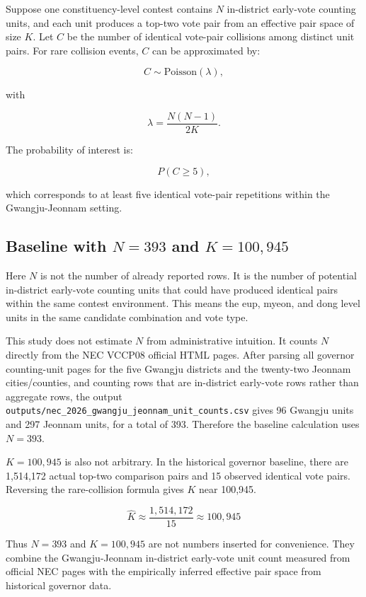 \documentclass[preprint]{../ieie/IEIE}
\begin{document}
Suppose one constituency-level contest contains \(N\) in-district early-vote counting units, and each unit produces a top-two vote pair from an effective pair space of size \(K\). Let \(C\) be the number of identical vote-pair collisions among distinct unit pairs. For rare collision events, \(C\) can be approximated by:

\[
C \sim \mathrm{Poisson}(\lambda),
\]

with

\[
\lambda = \frac{N(N-1)}{2K}.
\]

The probability of interest is:

\[
P(C \geq 5),
\]

which corresponds to at least five identical vote-pair repetitions within the Gwangju-Jeonnam setting.

\subsection{Baseline with \(N=393\) and \(K=100,945\)}

Here \(N\) is not the number of already reported rows. It is the number of potential in-district early-vote counting units that could have produced identical pairs within the same contest environment. This means the eup, myeon, and dong level units in the same candidate combination and vote type.

This study does not estimate \(N\) from administrative intuition. It counts \(N\) directly from the NEC VCCP08 official HTML pages. After parsing all governor counting-unit pages for the five Gwangju districts and the twenty-two Jeonnam cities/counties, and counting rows that are in-district early-vote rows rather than aggregate rows, the output \texttt{outputs/nec\_2026\_gwangju\_jeonnam\_unit\_counts.csv} gives 96 Gwangju units and 297 Jeonnam units, for a total of 393. Therefore the baseline calculation uses \(N=393\).

\(K=100,945\) is also not arbitrary. In the historical governor baseline, there are 1,514,172 actual top-two comparison pairs and 15 observed identical vote pairs. Reversing the rare-collision formula gives \(K\) near 100,945.

\[
\hat{K} \approx \frac{1,514,172}{15} \approx 100,945
\]

Thus \(N=393\) and \(K=100,945\) are not numbers inserted for convenience. They combine the Gwangju-Jeonnam in-district early-vote unit count measured from official NEC pages with the empirically inferred effective pair space from historical governor data.
\end{document}
